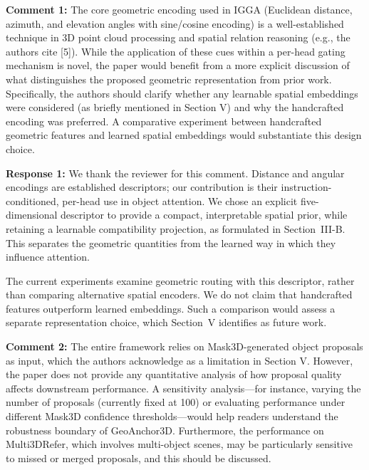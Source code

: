 

{\noindent\color{comment}
\textbf{Comment 1:}
The core geometric encoding used in IGGA (Euclidean distance, azimuth, and elevation angles with sine/cosine encoding) is a well-established technique in 3D point cloud processing and spatial relation reasoning (e.g., the authors cite [5]). While the application of these cues within a per-head gating mechanism is novel, the paper would benefit from a more explicit discussion of what distinguishes the proposed geometric representation from prior work. Specifically, the authors should clarify whether any learnable spatial embeddings were considered (as briefly mentioned in Section V) and why the handcrafted encoding was preferred. A comparative experiment between handcrafted geometric features and learned spatial embeddings would substantiate this design choice.
}\vspace{\comafter}

\noindent\textbf{Response 1:}
We thank the reviewer for this comment. Distance and angular encodings are established descriptors; our contribution is their instruction-conditioned, per-head use in object attention. We chose an explicit five-dimensional descriptor to provide a compact, interpretable spatial prior, while retaining a learnable compatibility projection, as formulated in Section~III-B. This separates the geometric quantities from the learned way in which they influence attention.

The current experiments examine geometric routing with this descriptor, rather than comparing alternative spatial encoders. We do not claim that handcrafted features outperform learned embeddings. Such a comparison would assess a separate representation choice, which Section~V identifies as future work.
\vspace{\resafter}


{\noindent\color{comment}
\textbf{Comment 2:}
The entire framework relies on Mask3D-generated object proposals as input, which the authors acknowledge as a limitation in Section V. However, the paper does not provide any quantitative analysis of how proposal quality affects downstream performance. A sensitivity analysis---for instance, varying the number of proposals (currently fixed at 100) or evaluating performance under different Mask3D confidence thresholds---would help readers understand the robustness boundary of GeoAnchor3D. Furthermore, the performance on Multi3DRefer, which involves multi-object scenes, may be particularly sensitive to missed or merged proposals, and this should be discussed.
}\vspace{\comafter}

